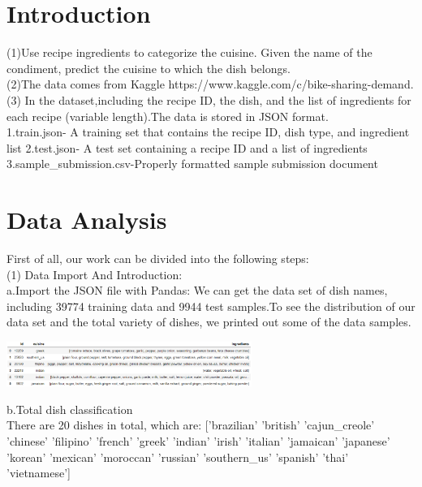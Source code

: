 \section{Introduction}
\label{sec-intro}
   (1)Use recipe ingredients to categorize the cuisine.
   Given the name of the condiment, predict the cuisine to which the dish belongs.\\
   (2)The data comes from Kaggle https://www.kaggle.com/c/bike-sharing-demand.\\
   (3) In the dataset,including the recipe ID, the dish, and the list of ingredients for each recipe (variable length).The data is stored in JSON format. \\
   1.train.json- A training set that contains the recipe ID, dish type, and ingredient list
   2.test.json- A test set containing a recipe ID and a list of ingredients
   3.sample_submission.csv-Properly formatted sample submission document
\section{Data Analysis} \label{sec-preliminaries}

First of all, our work can be divided into the following steps:\\
(1)   Data Import And Introduction:\\a.Import the JSON file with Pandas:
We can get the data set of dish names, including 39774 training data and 9944 test samples.To see the distribution of our data set and the total variety of dishes, we printed out some of the data samples.
\begin{center}
  \begin{minipage}{1\linewidth}
  \centering
  \includegraphics[width=0.6\textwidth]{pic01/a .eps}
  \end{minipage}
  b.Total dish classification\\
        There are 20 dishes in total, which are:
        ['brazilian' 'british' 'cajun_creole' 'chinese' 'filipino' 'french'
         'greek' 'indian' 'irish' 'italian' 'jamaican' 'japanese' 'korean'
         'mexican' 'moroccan' 'russian' 'southern_us' 'spanish' 'thai'
         'vietnamese']
  \hfill
\end{center}

